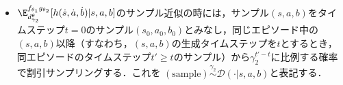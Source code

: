 \documentclass[a4paper,10pt,dvipdfmx]{jsarticle}
\begin{document}
\begin{itemize}
\begin{itemize}
        \item $\gamma^t$に比例した確率で$\mathcal{D}$からサンプリングし，サンプル平均をとる．
        \item 以上のサンプリング方法を，$\gamma$による割引サンプリング（discount sampling）と呼ぶことにする．また，$\mathrm{(sample)}\overset{\gamma}{\sim}\mathcal{D}$と表記する．
    \end{itemize}
    \item $\E_{d_{\gamma_2}^{\theta}}^{f_{\theta_1}g_{\theta_2}}[h(\dot{s},\dot{a},\dot{b})|s,a,b]$のサンプル近似の時には，サンプル$(s,a,b)$をタイムステップ$t=0$のサンプル$(s_0,a_0,b_0)$とみなし，同じエピソード中の$(s,a,b)$以降（すなわち，$(s,a,b)$の生成タイムステップを$t$とするとき，同エピソードのタイムステップ$t'\ge t$のサンプル）から$\gamma_2^{t'-t}$に比例する確率で割引サンプリングする．これを $\mathrm{(sample)}\overset{\gamma_2}{\sim}\mathcal{D}(\cdot|s,a,b)$と表記する．


\end{itemize}
\end{document}
